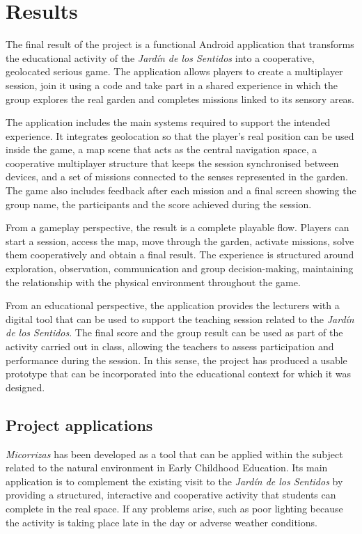 \chapter{Results}
The final result of the project is a functional Android application that transforms the educational activity of the \textit{Jardín de los Sentidos} into a cooperative, geolocated serious game. The application allows players to create a multiplayer session, join it using a code and take part in a shared experience in which the group explores the real garden and completes missions linked to its sensory areas.

The application includes the main systems required to support the intended experience. It integrates geolocation so that the player’s real position can be used inside the game, a map scene that acts as the central navigation space, a cooperative multiplayer structure that keeps the session synchronised between devices, and a set of missions connected to the senses represented in the garden. The game also includes feedback after each mission and a final screen showing the group name, the participants and the score achieved during the session.

From a gameplay perspective, the result is a complete playable flow. Players can start a session, access the map, move through the garden, activate missions, solve them cooperatively and obtain a final result. The experience is structured around exploration, observation, communication and group decision-making, maintaining the relationship with the physical environment throughout the game.

From an educational perspective, the application provides the lecturers with a digital tool that can be used to support the teaching session related to the \textit{Jardín de los Sentidos}. The final score and the group result can be used as part of the activity carried out in class, allowing the teachers to assess participation and performance during the session. In this sense, the project has produced a usable prototype that can be incorporated into the educational context for which it was designed.

\section{Project applications}
\textit{Micorrizas} has been developed as a tool that can be applied within the subject related to the natural environment in Early Childhood Education. Its main application is to complement the existing visit to the \textit{Jardín de los Sentidos} by providing a structured, interactive and cooperative activity that students can complete in the real space. If any problems arise, such as poor lighting because the activity is taking place late in the day or adverse weather conditions.

